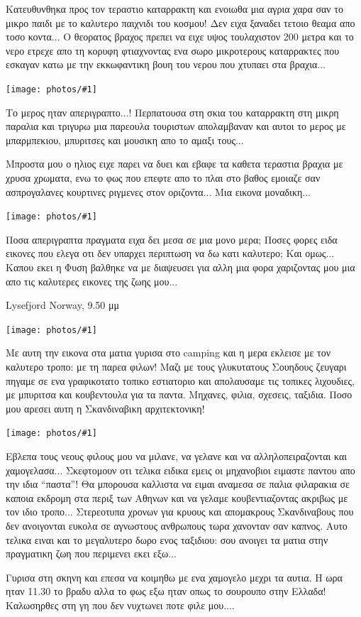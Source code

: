 \documentclass[11pt, letterpaper]{book}
\newcommand\photo[1]{\begin{center}\noindent\texttt{[image: photos/\#1]}\end{center}}
\begin{document}
Κατευθυνθηκα προς τον τεραστιο καταρρακτη και ενοιωθα μια αγρια χαρα σαν το μικρο παιδι με το καλυτερο παιχνιδι του κοσμου!
Δεν ειχα ξαναδει τετοιο θεαμα απο τοσο κοντα... Ο θεορατος βραχος πρεπει να ειχε υψος τουλαχιστον 200 μετρα και το νερο ετρεχε απο τη κορυφη φτιαχνοντας ενα σωρο μικροτερους καταρρακτες που εσκαγαν κατω με την εκκωφαντικη βουη του νερου που χτυπαει στα βραχια...

\photo{205.jpg}

Το μερος ηταν απεριγραπτο...! 
Περπατουσα στη σκια του καταρρακτη στη μικρη παραλια και τριγυρω μια παρεουλα τουριστων απολαμβαναν και αυτοι το μερος με μπαρμπεκιου, μπυριτσες και μουσικη απο το αμαξι τους...

Μπροστα μου ο ηλιος ειχε παρει να δυει και εβαφε τα καθετα τεραστια βραχια με χρυσα χρωματα, ενω το φως που επεφτε απο το πλαι στο βαθος εμοιαζε σαν ασπρογαλανες κουρτινες ριγμενες στον οριζοντα... Μια εικονα μοναδικη...

\photo{206.jpg}

Ποσα απεριγραπτα πραγματα ειχα δει μεσα σε μια μονο μερα; 
Ποσες φορες ειδα εικονες που ελεγα οτι δεν υπαρχει περιπτωση να δω κατι καλυτερο; 
Και ομως... Καπου εκει η Φυση βαλθηκε να με διαψευσει για αλλη μια φορα χαριζοντας μου μια απο τις καλυτερες εικονες της ζωης μου...


Lysefjord Norway, 9.50 μμ

\photo{207.jpg}

Με αυτη την εικονα στα ματια γυρισα στο camping και η μερα εκλεισε με τον καλυτερο τροπο: με τη παρεα φιλων!
Μαζι με τους γλυκυτατους Σουηδους ζευγαρι πηγαμε σε ενα γραφικοτατο τοπικο εστιατοριο και απολαυσαμε τις τοπικες λιχουδιες, με μπυριτσα και κουβεντουλα για τα παντα. Μηχανες, φιλια, σχεσεις, ταξιδια.
Ποσο μου αρεσει αυτη η Σκανδιναβικη αρχιτεκτονικη!

\photo{208.jpg}

Εβλεπα τους νεους φιλους μου να μιλανε, να γελανε και να αλληλοπειραζονται και χαμογελασα... Σκεφτομουν οτι τελικα ειδικα εμεις οι μηχανοβιοι ειμαστε παντου απο την ιδια ``παστα''! Θα μπορουσα καλλιστα να ειμαι αναμεσα σε παλια φιλαρακια σε καποια εκδρομη στα περιξ των Αθηνων και να γελαμε κουβεντιαζοντας ακριβως με τον ιδιο τροπο...
Στερεοτυπα χρονων για κρυους και απομακρους Σκανδιναβους που δεν ανοιγονται ευκολα σε αγνωστους ανθρωπους τωρα χανονταν σαν καπνος. Αυτο τελικα ειναι και το μεγαλυτερο δωρο ενος ταξιδιου: σου ανοιγει τα ματια στην πραγματικη ζωη που περιμενει εκει εξω...

Γυρισα στη σκηνη και επεσα να κοιμηθω με ενα χαμογελο μεχρι τα αυτια.
Η ωρα ηταν 11.30 το βραδυ αλλα το φως εξω ηταν οπως το σουρουπο στην Ελλαδα! 
Καλωσηρθες στη γη που δεν νυχτωνει ποτε φιλε μου....
\end{document}
